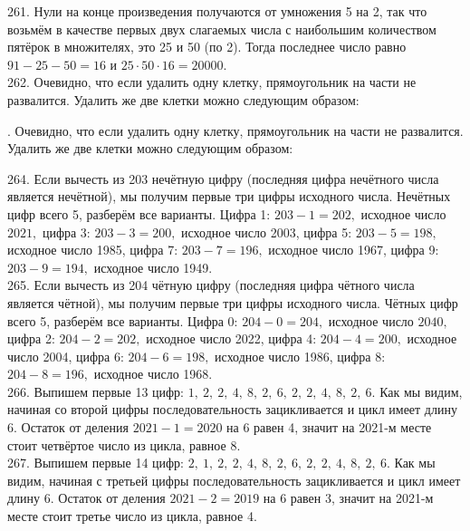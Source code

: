 261. Нули на конце произведения получаются от умножения 5 на 2, так что возьмём в качестве первых двух слагаемых числа с наибольшим количеством пятёрок в множителях, это 25 и 50 (по 2). Тогда последнее число равно $91-25-50=16$ и $25\cdot50\cdot16=20000.$\\
262. Очевидно, что если удалить одну клетку, прямоугольник на части не развалится. Удалить же две клетки можно следующим образом:
\begin{center}
\begin{figure}[ht!]
\end{figure}
\end{center}
\newpage{}. Очевидно, что если удалить одну клетку, прямоугольник на части не развалится. Удалить же две клетки можно следующим образом:
\begin{center}
\begin{figure}[ht!]
\end{figure}
\end{center}
264. Если вычесть из 203 нечётную цифру (последняя цифра нечётного числа является нечётной), мы получим первые три цифры исходного числа. Нечётных цифр всего 5, разберём все варианты. Цифра 1: $203-1=202,$ исходное число $2021,$ цифра 3: $203-3=200,$ исходное число 2003, цифра 5: $203-5=198,$ исходное число 1985, цифра 7: $203-7=196,$ исходное число 1967, цифра 9: $203-9=194,$ исходное число 1949.\\
265. Если вычесть из 204 чётную цифру (последняя цифра чётного числа является чётной), мы получим первые три цифры исходного числа. Чётных цифр всего 5, разберём все варианты. Цифра 0: $204-0=204,$ исходное число $2040,$ цифра 2: $204-2=202,$ исходное число 2022, цифра 4: $204-4=200,$ исходное число 2004, цифра 6: $204-6=198,$ исходное число 1986, цифра 8: $204-8=196,$ исходное число 1968.\\
266. Выпишем первые 13 цифр: $1,\ 2,\ 2,\ 4,\ 8,\ 2,\ 6,\ 2,\ 2,\ 4,\ 8,\ 2,\ 6.$ Как мы видим, начиная со второй цифры последовательность зацикливается и цикл имеет длину 6. Остаток от деления $2021-1=2020$ на 6 равен 4, значит на 2021-м месте стоит четвёртое число из цикла, равное 8.\\
267. Выпишем первые 14 цифр: $2,\ 1,\ 2,\ 2,\ 4,\ 8,\ 2,\ 6,\ 2,\ 2,\ 4,\ 8,\ 2,\ 6.$ Как мы видим, начиная с третьей цифры последовательность зацикливается и цикл имеет длину 6. Остаток от деления $2021-2=2019$ на 6 равен 3, значит на 2021-м месте стоит третье число из цикла, равное 4.\\
